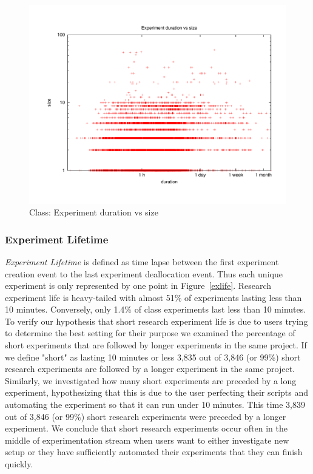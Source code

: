 \documentclass[10pt]{article}
\begin{document}
\begin{figure}[htbp]
\begin{center}
\includegraphics[width=5in]{figs/cdvss.pdf}
\caption{Class: Experiment duration vs size}
\label{cdvss}
\end{center}
\end{figure}


\subsubsection{Experiment Lifetime}
{\it Experiment Lifetime} is defined as 
 time lapse between the first experiment creation
event to the last experiment deallocation event. 
Thus each unique experiment is only represented by one point in 
Figure~\ref{exlife}. 
Research experiment life is heavy-tailed with almost
51\% of experiments lasting less than 10 minutes. Conversely, only 1.4\%
of class experiments last less than 10 minutes. To verify our hypothesis
that short research experiment life is due to users trying to determine
the best setting for their purpose we examined the percentage of short
experiments that are followed by longer experiments in the same project.
If we define "short" as lasting 10 minutes or less 3,835 out of 3,846
(or 99\%) short research experiments are followed by a longer experiment
in the same project. Similarly, we investigated how many short
experiments are preceded by a long experiment, hypothesizing that this
is due to the user perfecting their scripts and automating the
experiment so that it can run under 10 minutes. This time  3,839 out of
3,846 (or 99\%) short research experiments were preceded by a longer
experiment. We conclude that short research experiments occur often in
the middle of experimentation stream when users want to either
investigate new setup or they have sufficiently automated their
experiments that they can finish quickly.
\end{document}
